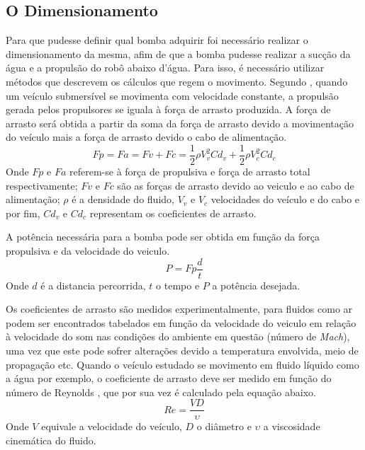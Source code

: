 \subsection{O Dimensionamento}
Para que pudesse definir qual bomba adquirir foi necessário realizar o dimensionamento da mesma, afim de que a bomba pudesse realizar a sucção da água e a  propulsão do robô abaixo d’água. Para isso, é necessário utilizar métodos que descrevem os cálculos que regem o movimento. Segundo
, quando um veículo submersível se movimenta com velocidade constante,
a propulsão gerada pelos propulsores se iguala à força de arrasto produzida. A
força de arrasto será obtida a partir da soma da força de arrasto devido a 
movimentação do veículo mais a força de arrasto devido o cabo de alimentação.
\begin{displaymath}
  Fp = Fa = Fv + Fc = \frac{1}{2}\rho V^{2}_{v}Cd_{v} + \frac{1}{2}\rho V^{2}_{c}Cd_{c}
\end{displaymath}
Onde $Fp$ e $Fa$ referem-se à força de propulsiva e força de arrasto total
respectivamente; $Fv$ e $Fc$ são as forças de arrasto devido ao veiculo e ao cabo de
alimentação; $\rho$ é a densidade do fluido, $V_{v}$ e $V_{c}$ velocidades do
veículo e do cabo e por fim, $Cd_{v}$ e $Cd_{c}$ representam os coeficientes
de arrasto.
\par
A potência necessária para a bomba pode ser obtida em função da força propulsiva
e da velocidade do veiculo.
\begin{displaymath}
  P = Fp\frac{d}{t}
\end{displaymath}
Onde $d$ é a distancia percorrida, $t$ o tempo e $P$ a potência desejada.
\par
Os coeficientes de arrasto são medidos experimentalmente, para fluidos como
ar podem ser encontrados tabelados em função da velocidade do veiculo em relação
à velocidade do som nas condições do ambiente em questão (número de \textit{Mach}), uma
vez que este pode sofrer alterações devido a temperatura envolvida, meio de
propagação etc. Quando o veículo estudado se movimento em fluido líquido como a
água por exemplo, o coeficiente de arrasto deve ser medido em função do número
de Reynolds \cite{eng2008}, que por sua vez é calculado pela equação abaixo.
\begin{displaymath}
  Re = \frac{VD}{\upsilon}
\end{displaymath}
Onde $V$ equivale a velocidade do veículo, $D$ o diâmetro e $\upsilon$ a viscosidade
cinemática do fluido.
\par
